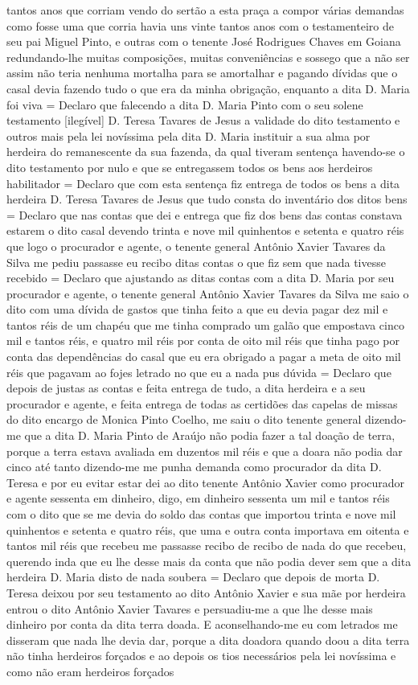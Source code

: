 \begin{refsection}
tantos anos que corriam vendo do sertão a esta praça a compor várias demandas como fosse uma que corria havia uns vinte tantos anos com o testamenteiro de seu pai Miguel Pinto, e outras com o tenente José Rodrigues Chaves em Goiana redundando-lhe muitas composições, muitas conveniências e sossego que a não ser assim não teria nenhuma mortalha para se amortalhar e pagando dívidas que o casal devia fazendo tudo o que era da minha obrigação, enquanto a dita D. Maria foi viva = Declaro que falecendo a dita D. Maria Pinto com o seu solene testamento [ilegível] D. Teresa Tavares de Jesus a validade do dito testamento e outros mais pela lei novíssima pela dita D. Maria instituir a sua alma por herdeira do remanescente da sua fazenda, da qual tiveram sentença havendo-se o dito testamento por nulo e que se entregassem todos os bens aos herdeiros habilitador = Declaro que com esta sentença fiz entrega de todos os bens a dita herdeira D. Teresa Tavares de Jesus que tudo consta do inventário dos ditos bens = Declaro que nas contas que dei e entrega que fiz dos bens das contas constava estarem o dito casal devendo trinta e nove mil quinhentos e setenta e quatro réis que logo o procurador e agente, o tenente general Antônio Xavier Tavares da Silva me pediu passasse eu recibo  ditas contas o que fiz sem que nada tivesse recebido = Declaro que ajustando as ditas contas com a dita D. Maria por seu procurador e agente, o tenente general Antônio Xavier Tavares da Silva me saio o dito com uma dívida de gastos que tinha feito a que eu devia pagar dez mil e tantos réis de um chapéu que me tinha comprado um galão que empostava cinco mil e tantos réis, e quatro mil réis por conta de oito mil réis que tinha pago por conta das dependências do casal que eu era obrigado a pagar a meta de oito mil réis que pagavam ao fojes letrado no que eu a nada pus dúvida = Declaro que depois de justas as contas e feita entrega de tudo, a dita herdeira e a seu procurador e agente, e feita entrega de todas as certidões das capelas de missas do dito encargo de Monica Pinto Coelho, me saiu o dito tenente general dizendo-me que a dita D. Maria Pinto de Araújo não podia fazer a tal doação de terra, porque a terra estava avaliada em duzentos mil réis e que a doara não podia dar cinco até tanto dizendo-me me punha demanda como procurador da dita D. Teresa e por eu evitar estar dei ao dito tenente Antônio Xavier como procurador e agente sessenta em dinheiro, digo, em dinheiro sessenta um mil e tantos réis com o dito que se me devia do soldo das contas que importou trinta e nove mil quinhentos e setenta e quatro réis, que uma e outra conta importava em oitenta e tantos mil réis que recebeu me passasse recibo de recibo de nada do que recebeu, querendo inda que eu lhe desse mais da conta que não podia dever sem que a dita herdeira D. Maria disto de nada soubera = Declaro que depois de morta D. Teresa deixou por seu testamento ao dito Antônio Xavier e sua mãe por herdeira entrou o dito Antônio Xavier Tavares e persuadiu-me a que lhe desse mais dinheiro por conta da dita terra doada. E aconselhando-me eu com letrados me disseram que nada lhe devia dar, porque a dita doadora quando doou a dita terra não tinha herdeiros forçados e ao depois os tios necessários pela lei novíssima e como não eram herdeiros forçados 
\end{refsection}
